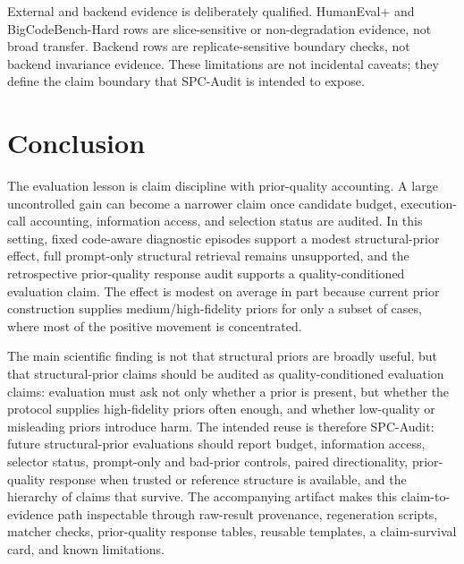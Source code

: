 \documentclass{article}
\begin{document}
External and backend evidence is deliberately qualified. HumanEval+ and BigCodeBench-Hard rows are slice-sensitive or non-degradation evidence, not broad transfer. Backend rows are replicate-sensitive boundary checks, not backend invariance evidence. These limitations are not incidental caveats; they define the claim boundary that SPC-Audit is intended to expose.

\section{Conclusion}
The evaluation lesson is claim discipline with prior-quality accounting. A large uncontrolled gain can become a narrower claim once candidate budget, execution-call accounting, information access, and selection status are audited. In this setting, fixed code-aware diagnostic episodes support a modest structural-prior effect, full prompt-only structural retrieval remains unsupported, and the retrospective prior-quality response audit supports a quality-conditioned evaluation claim. The effect is modest on average in part because current prior construction supplies medium/high-fidelity priors for only a subset of cases, where most of the positive movement is concentrated.

The main scientific finding is not that structural priors are broadly useful, but that structural-prior claims should be audited as quality-conditioned evaluation claims: evaluation must ask not only whether a prior is present, but whether the protocol supplies high-fidelity priors often enough, and whether low-quality or misleading priors introduce harm. The intended reuse is therefore SPC-Audit: future structural-prior evaluations should report budget, information access, selector status, prompt-only and bad-prior controls, paired directionality, prior-quality response when trusted or reference structure is available, and the hierarchy of claims that survive. The accompanying artifact makes this claim-to-evidence path inspectable through raw-result provenance, regeneration scripts, matcher checks, prior-quality response tables, reusable templates, a claim-survival card, and known limitations.
\end{document}
